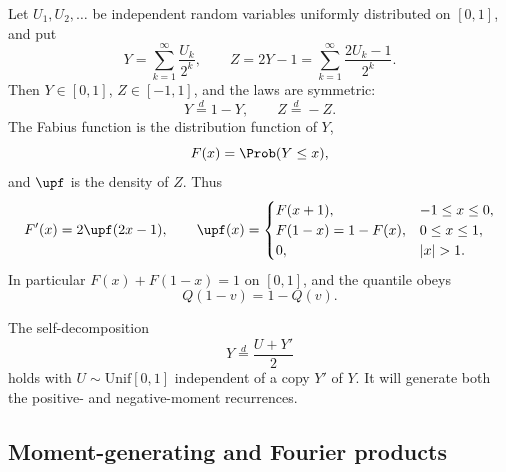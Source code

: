 \documentclass[11pt,oneside]{article}
\theoremstyle{definition}
\theoremstyle{remark}
\newcommand{\F}{F}
\newcommand{\Q}{Q}
\newcommand{\1}{\mathbf 1}
\begin{document}
Let \(U_1,U_2,\ldots\) be independent random variables uniformly distributed on
\([0,1]\), and put
\begin{equation}\label{p10:eq:Ydef}
 Y=\sum_{k=1}^{\infty}\frac{U_k}{2^k},
 \qquad
 Z=2Y-1=\sum_{k=1}^{\infty}\frac{2U_k-1}{2^k}.
\end{equation}
Then \(Y\in[0,1]\), \(Z\in[-1,1]\), and the laws are symmetric:
\begin{equation}\label{p10:eq:symmetry-laws}
 Y\overset d=1-Y,
 \qquad Z\overset d=-Z.
\end{equation}
The Fabius function is the distribution function of \(Y\),
\begin{equation}\label{p10:eq:Fdist}
 \F(x)=\Prob(Y\le x),
\end{equation}
and \(\upf\) is the density of \(Z\).  Thus
\begin{equation}\label{p10:eq:F-up-relations}
 \F'(x)=2\upf(2x-1),\qquad
 \upf(x)=
 \begin{cases}
   \F(x+1),&-1\le x\le0,\\
   \F(1-x)=1-\F(x),&0\le x\le1,\\
   0,&|x|>1.
 \end{cases}
\end{equation}
In particular \(\F(x)+\F(1-x)=1\) on \([0,1]\), and the quantile obeys
\begin{equation}\label{p10:eq:Qsymmetry}
 \Q(1-v)=1-\Q(v).
\end{equation}

The self-decomposition
\begin{equation}\label{p10:eq:smoothing}
 Y\overset d=\frac{U+Y'}2
\end{equation}
holds with \(U\sim\mathrm{Unif}[0,1]\) independent of a copy \(Y'\) of \(Y\).
It will generate both the positive- and negative-moment recurrences.

\subsection{Moment-generating and Fourier products}
\end{document}
